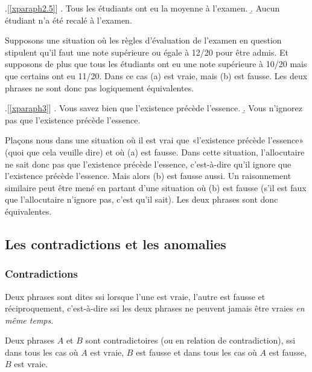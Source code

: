 \begin{refsegment}
\begin{exo}
\begin{solu}
\ex.[\ref{xparaph2.5}]
\a. Tous les étudiants ont eu la moyenne à l'examen.
\b. Aucun étudiant n'a été recalé à l'examen.

Supposons une situation où les règles d'évaluation de l'examen en question stipulent qu'il faut une note supérieure ou égale à 12/20 pour être admis. Et supposons de plus que tous les étudiants ont eu une note supérieure à 10/20 mais que certains ont eu 11/20.  Dans ce cas (a) est vraie, mais (b) est fausse. Les deux phrases ne sont donc pas logiquement équivalentes.


\ex.[\ref{xparaph3}]
\a. Vous savez bien que l'existence précède l'essence.
\b. Vous n'ignorez pas que l'existence précède l'essence.

Plaçons nous dans une situation où il est vrai que «l'existence précède l'essence» (quoi que cela veuille dire) et où (a) est fausse. Dans cette situation, l'allocutaire ne sait donc pas que l'existence précède l'essence, c'est-à-dire qu'il ignore que l'existence précède l'essence.  Mais alors (b) est fausse aussi. Un raisonnement similaire peut être mené en partant d'une situation où (b) est fausse (s'il est faux que l'allocutaire n'ignore pas, c'est qu'il sait).  Les deux phrases sont donc équivalentes.

\end{solu}
\end{exo}


\subsection{Les contradictions et les anomalies}

\subsubsection{Contradictions}
\label{sss:contrad}

Deux phrases sont dites  ssi lorsque l'une est vraie,
l'autre est fausse et réciproquement, c'est-à-dire ssi les deux phrases
ne peuvent jamais être vraies \emph{en même temps}.

\begin{defi}\label{d:contra1}
Deux phrases $A$ et $B$ sont contradictoires (ou en relation de
contradiction), ssi dans tous les cas où $A$ est vraie, $B$ est
fausse et dans tous les cas où $A$ est fausse, $B$ est vraie.
\end{defi}


\end{refsegment}
